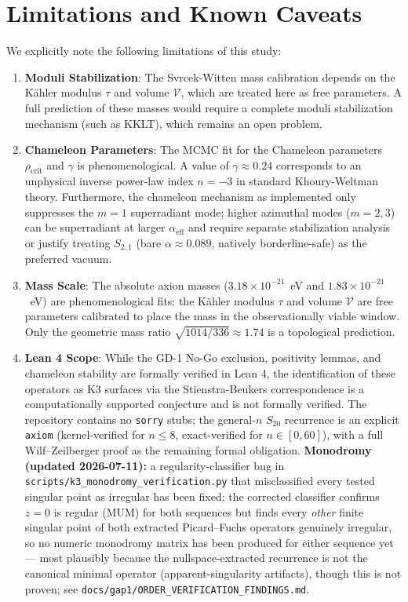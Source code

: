 \documentclass[11pt,a4paper]{article}
\begin{document}
\section{Limitations and Known Caveats}\label{sec:limitations}
We explicitly note the following limitations of this study:
\begin{enumerate}
    \item \textbf{Moduli Stabilization}: The Svrcek-Witten mass calibration depends on the Kähler modulus $\tau$ and volume $\mathcal{V}$, which are treated here as free parameters. A full prediction of these masses would require a complete moduli stabilization mechanism (such as KKLT), which remains an open problem.
    \item \textbf{Chameleon Parameters}: The MCMC fit for the Chameleon parameters $\rho_{\text{crit}}$ and $\gamma$ is phenomenological. A value of $\gamma \approx 0.24$ corresponds to an unphysical inverse power-law index $n = -3$ in standard Khoury-Weltman theory. Furthermore, the chameleon mechanism as implemented only suppresses the $m=1$ superradiant mode; higher azimuthal modes ($m=2,3$) can be superradiant at larger $\alpha_\mathrm{eff}$ and require separate stabilization analysis or justify treating $S_{2,1}$ (bare $\alpha\approx0.089$, natively borderline-safe) as the preferred vacuum.
    \item \textbf{Mass Scale}: The absolute axion masses ($3.18\times10^{-21}$~eV and $1.83\times10^{-21}$~eV) are phenomenological fits: the Kähler modulus $\tau$ and volume $\mathcal{V}$ are free parameters calibrated to place the mass in the observationally viable window. Only the geometric mass ratio $\sqrt{1014/336}\approx1.74$ is a topological prediction.
    \item \textbf{Lean 4 Scope}: While the GD-1 No-Go exclusion, positivity lemmas, and chameleon stability are formally verified in Lean 4, the identification of these operators as K3 surfaces via the Stienstra-Beukers correspondence is a computationally supported conjecture and is not formally verified. The repository contains no \texttt{sorry} stubs; the general-$n$ $S_{20}$ recurrence is an explicit \texttt{axiom} (kernel-verified for $n\le8$, exact-verified for $n\in[0,60]$), with a full Wilf--Zeilberger proof as the remaining formal obligation. \textbf{Monodromy (updated 2026-07-11):} a regularity-classifier bug in \texttt{scripts/k3\_monodromy\_verification.py} that misclassified every tested singular point as irregular has been fixed; the corrected classifier confirms $z=0$ is regular (MUM) for both sequences but finds every \emph{other} finite singular point of both extracted Picard--Fuchs operators genuinely irregular, so no numeric monodromy matrix has been produced for either sequence yet — most plausibly because the nullspace-extracted recurrence is not the canonical minimal operator (apparent-singularity artifacts), though this is not proven; see \texttt{docs/gap1/ORDER\_VERIFICATION\_FINDINGS.md}.

\end{enumerate}
\end{document}
